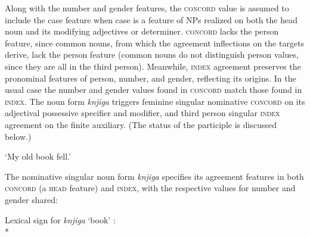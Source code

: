 \documentclass[output=paper,biblatex,babelshorthands,newtxmath,draftmode,colorlinks,citecolor=brown]{langscibook}
\begin{document}
Along with the number and gender features, the \textsc{concord} value is assumed to include the case
feature when case is a feature of NPs  realized on both the head noun and its modifying adjectives
or determiner.   \textsc{concord} lacks the person feature, since  common nouns, from which the
agreement inflections on the targets derive, lack the person feature (common nouns do not
distinguish person values, since they are all in the third person).    Meanwhile, \textsc{index}
agreement preserves the pronominal features of person, number, and gender, reflecting its origins.
In the usual case the number and gender values found in \textsc{concord} match those found in
\textsc{index}.  The  noun form \textit{knjiga} triggers feminine singular
nominative \textsc{concord} on its adjectival possessive specifier and modifier, and third person
singular \textsc{index} agreement on the finite auxiliary.  (The status of the participle is
discussed below.)

\begin{exe}
\ex  \label{fell}
\glt `My old book fell.'
\end{exe}

\noindent
The nominative singular noun form \emph{knjiga} specifies its agreement features in both \textsc{concord} (a \textsc{head} feature) and \textsc{index}, with the respective values for number and gender shared:

\eas
\label{knjiga-avm} Lexical sign for \emph{knjiga} `book' \citep[from][18]{Wechsler+Zlatic:2003}: \\*
\zs
\end{document}
